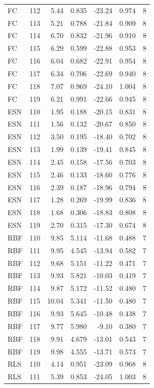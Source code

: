 \begin{longtable}{llrrrrr}
FC & 112 & 5.44 & 0.835 & -23.24 & 0.974 & 8 \\
FC & 113 & 5.21 & 0.788 & -21.84 & 0.909 & 8 \\
FC & 114 & 6.70 & 0.832 & -21.96 & 0.910 & 8 \\
FC & 115 & 6.29 & 0.599 & -22.88 & 0.953 & 8 \\
FC & 116 & 6.04 & 0.682 & -22.91 & 0.954 & 8 \\
FC & 117 & 6.34 & 0.706 & -22.69 & 0.940 & 8 \\
FC & 118 & 7.07 & 0.969 & -24.10 & 1.004 & 8 \\
FC & 119 & 6.21 & 0.991 & -22.66 & 0.945 & 8 \\
ESN & 110 & 1.95 & 0.188 & -20.15 & 0.831 & 8 \\
ESN & 111 & 1.56 & 0.132 & -20.67 & 0.850 & 8 \\
ESN & 112 & 3.50 & 0.195 & -18.40 & 0.702 & 8 \\
ESN & 113 & 1.99 & 0.139 & -19.41 & 0.845 & 8 \\
ESN & 114 & 2.45 & 0.158 & -17.56 & 0.703 & 8 \\
ESN & 115 & 2.46 & 0.133 & -18.60 & 0.776 & 8 \\
ESN & 116 & 2.39 & 0.187 & -18.96 & 0.794 & 8 \\
ESN & 117 & 1.28 & 0.269 & -19.99 & 0.836 & 8 \\
ESN & 118 & 1.68 & 0.306 & -18.83 & 0.808 & 8 \\
ESN & 119 & 2.70 & 0.315 & -17.30 & 0.674 & 8 \\
RBF & 110 & 9.85 & 5.114 & -11.68 & 0.488 & 7 \\
RBF & 111 & 9.95 & 4.545 & -13.94 & 0.582 & 7 \\
RBF & 112 & 9.68 & 5.151 & -11.22 & 0.471 & 7 \\
RBF & 113 & 9.93 & 5.821 & -10.03 & 0.419 & 7 \\
RBF & 114 & 9.87 & 5.172 & -11.52 & 0.480 & 7 \\
RBF & 115 & 10.04 & 5.341 & -11.50 & 0.480 & 7 \\
RBF & 116 & 9.93 & 5.645 & -10.48 & 0.438 & 7 \\
RBF & 117 & 9.77 & 5.980 & -9.10 & 0.380 & 7 \\
RBF & 118 & 9.91 & 4.679 & -13.01 & 0.543 & 7 \\
RBF & 119 & 9.98 & 4.555 & -13.71 & 0.573 & 7 \\
RLS & 110 & 4.14 & 0.951 & -23.09 & 0.968 & 8 \\
RLS & 111 & 5.39 & 0.853 & -24.05 & 1.003 & 8 \\

\end{longtable}
